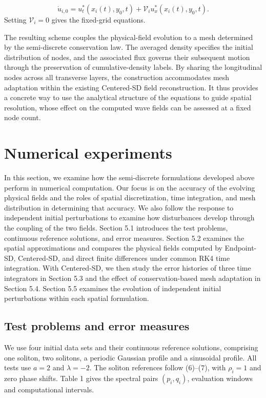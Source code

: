 \documentclass{article}
\theoremstyle{plain}
\theoremstyle{definition}
\begin{document}
\[\dot u_{i,0}=u_t^*(x_i(t),y_0,t)+\mathcal V_i u_x^*(x_i(t),y_0,t).\]
Setting \(\mathcal V_i=0\) gives the fixed-grid equations.

The resulting scheme couples the physical-field evolution to a mesh determined by the semi-discrete conservation law. The averaged density specifies the initial distribution of nodes, and the associated flux governs their subsequent motion through the preservation of cumulative-density labels. By sharing the longitudinal nodes across all transverse layers, the construction accommodates mesh adaptation within the existing Centered-SD field reconstruction. It thus provides a concrete way to use the analytical structure of the equations to guide spatial resolution, whose effect on the computed wave fields can be assessed at a fixed node count.


\FloatBarrier
\section{Numerical experiments}

In this section, we examine how the semi-discrete formulations developed above perform in numerical computation. Our focus is on the accuracy of the evolving physical fields and the roles of spatial discretization, time integration, and mesh distribution in determining that accuracy. We also follow the response to independent initial perturbations to examine how disturbances develop through the coupling of the two fields. Section 5.1 introduces the test problems, continuous reference solutions, and error measures. Section 5.2 examines the spatial approximations and compares the physical fields computed by Endpoint-SD, Centered-SD, and direct finite differences under common RK4 time integration. With Centered-SD, we then study the error histories of three time integrators in Section 5.3 and the effect of conservation-based mesh adaptation in Section 5.4. Section 5.5 examines the evolution of independent initial perturbations within each spatial formulation.


\FloatBarrier
\subsection{Test problems and error measures}

We use four initial data sets and their continuous reference solutions, comprising one soliton, two solitons, a periodic Gaussian profile and a sinusoidal profile. All tests use \(a=2\) and \(\lambda=-2\). The soliton references follow (6)–(7), with \(\rho_i=1\) and zero phase shifts. Table 1 gives the spectral pairs \((p_i,q_i)\), evaluation windows and computational intervals.
\end{document}
